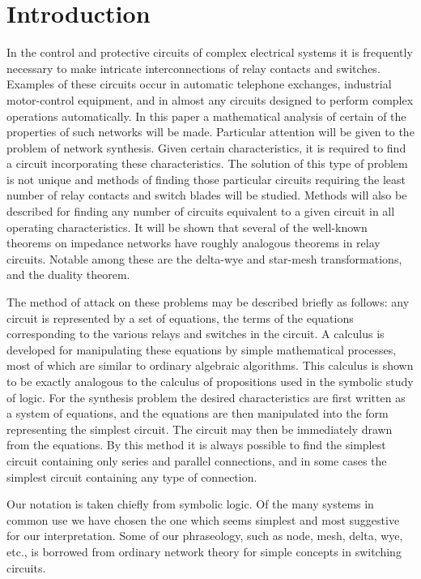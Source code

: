 \documentclass[12pt,oneside,letterpaper]{scrbook}
\begin{document}
	\chapter{Introduction}
		In the control and protective circuits of complex electrical systems it is frequently necessary to make intricate interconnections of relay contacts and switches. Examples of these circuits occur in automatic telephone exchanges, industrial motor-control equipment, and in almost any circuits designed to perform complex operations automatically. In this paper a mathematical analysis of certain of the properties of such networks will be made. Particular attention will be given to the problem of network synthesis. Given certain characteristics, it is required to find a circuit incorporating these characteristics. The solution of this type of problem is not unique and methods of finding those particular circuits requiring the least number of relay contacts and switch blades will be studied. Methods will also be described for finding any number of circuits equivalent to a given circuit in all operating characteristics. It will be shown that several of the well-known theorems on impedance networks have roughly analogous theorems in relay circuits. Notable among these are the delta-wye and star-mesh transformations, and the duality theorem.

		The method of attack on these problems may be described briefly as follows: any circuit is represented by a set of equations, the terms of the equations corresponding to the various relays and switches in the circuit. A calculus is developed for manipulating these equations by simple mathematical processes, most of which are similar to ordinary algebraic algorithms. This calculus is shown to be exactly analogous to the calculus of propositions used in the symbolic study of logic. For the synthesis problem the desired characteristics are first written as a system of equations, and the equations are then manipulated into the form representing the simplest circuit. The circuit may then be immediately drawn from the equations. By this method it is always possible to find the simplest circuit containing only series and parallel connections, and in some cases the simplest circuit containing any type of connection.


		Our notation is taken chiefly from symbolic logic. Of the many systems in common use we have chosen the one which seems simplest and most suggestive for our interpretation. Some of our phraseology, such as node, mesh, delta, wye, etc., is borrowed from ordinary network theory for simple concepts in switching circuits.
\end{document}
